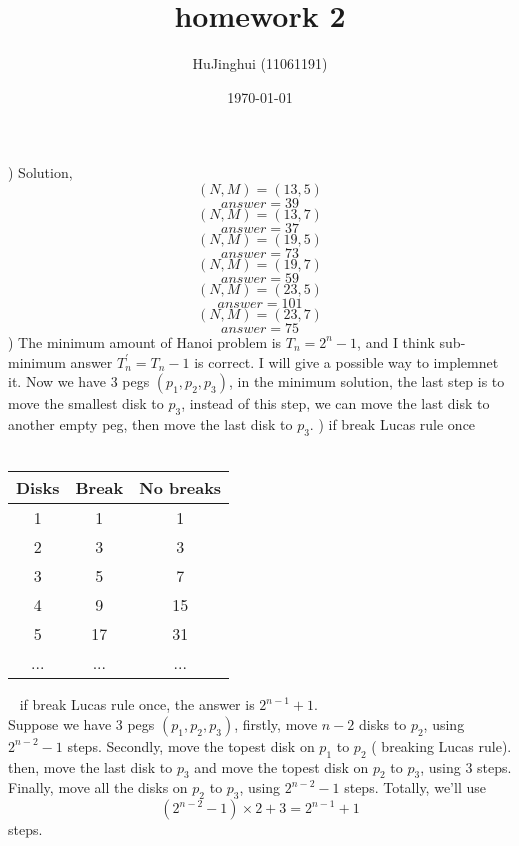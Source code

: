 \documentclass[a4paper,12pt]{article}
\begin{document}
\title{homework 2}
\author{HuJinghui (11061191)}
\date{\today}
\maketitle
{}) Solution,
$$(N, M) = (13, 5)$$
$$answer = 39$$
$$(N, M) = (13, 7)$$
$$answer = 37$$
$$(N, M) = (19, 5)$$
$$answer = 73$$
$$(N, M) = (19, 7)$$
$$answer = 59$$
$$(N, M) = (23, 5)$$
$$answer = 101$$
$$(N, M) = (23, 7)$$
$$answer = 75$$
) The minimum amount of Hanoi problem is $T_n=2^n-1$, and I think sub-minimum
answer $T^{'}_{n}=T_n-1$ is correct. I will give a possible way to 
implemnet it. Now we have 3 pegs $(p_1, p_2, p_3)$, in the minimum solution, 
the last step is to move the smallest disk to $p_3$, instead of this step,
we can move the last disk to another empty peg, then move the last disk
to $p_3$.
\newline
\clearpage
{}) if break Lucas rule once \\
~\newline
\begin{tabular}{c|cc}
Disks & Break & No breaks\\ \hline
1 & 1 & 1\\
2 & 3 & 3\\
3 & 5 & 7\\
4 & 9 & 15\\
5 & 17 & 31\\
... & ... & ...
\end{tabular}
~\newline
if break Lucas rule once, the answer is $2^{n-1}+1$.\\
Suppose we have 3 pegs $(p_1, p_2, p_3)$, firstly, move $n-2$ disks to $p_2$,
using $2^{n-2}-1$ steps. Secondly, move the topest disk on $p_1$ to $p_2$ (
breaking Lucas rule). then, move the last disk to $p_3$ and move the topest disk
on $p_2$ to $p_3$, using $3$ steps. Finally, move all the disks on $p_2$ to
$p_3$, using $2^{n-2}-1$ steps. Totally, we'll use
\[
(2^{n-2}-1) \times 2 + 3 = 2^{n-1}+1
\]
steps.
\end{document}
